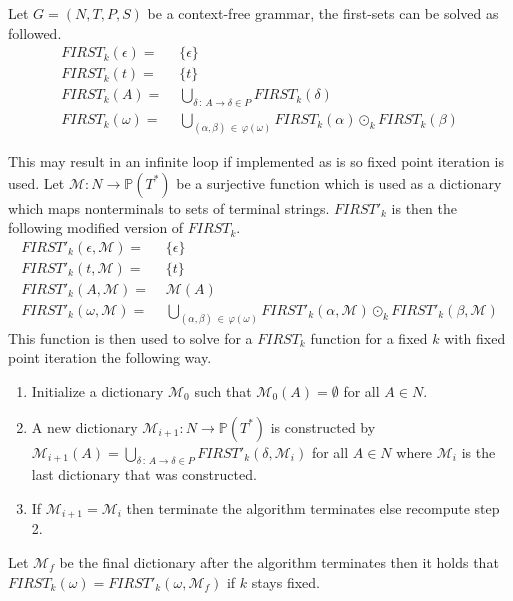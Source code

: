 \begin{algorithm}
    \label{algorithm:first}
    Let $G = (N, T, P, S)$ be a context-free grammar, the first-sets can be solved as followed.
    \begin{align*}
        FIRST_k(\epsilon) =&\,\, \{\epsilon\} \\
        FIRST_k(t) =&\,\, \{t\} \\
        FIRST_k(A) =&\,\, \bigcup_{\delta \, : \, A \to \delta \in P} FIRST_k(\delta) \\
        FIRST_k(\omega) =&\,\, \bigcup_{(\alpha, \beta) \, \in \, \varphi(\omega)} FIRST_k(\alpha) \odot_k FIRST_k(\beta)
    \end{align*}
\end{algorithm}
\noindent This may result in an infinite loop if implemented as is so fixed point iteration is used. Let $\mathcal{M}: N \to \mathbb{P}(T^*)$ be a surjective function which is used as a dictionary which maps nonterminals to sets of terminal strings. $FIRST'_k$ is then the following modified version of $FIRST_k$.
\begin{align*}
    FIRST'_k(\epsilon, \mathcal{M}) =&\,\, \{\epsilon\} \\
    FIRST'_k(t, \mathcal{M}) =&\,\, \{t\} \\
    FIRST'_k(A, \mathcal{M}) =&\,\, \mathcal{M}(A) \\
    FIRST'_k(\omega, \mathcal{M}) =&\,\, \bigcup_{(\alpha, \beta) \, \in \, \varphi(\omega)} FIRST'_k(\alpha, \mathcal{M}) \odot_k FIRST'_k(\beta, \mathcal{M})
\end{align*}
This function is then used to solve for a $FIRST_k$ function for a fixed $k$ with fixed point iteration the following way.
\begin{enumerate}
    \item Initialize a dictionary $\mathcal{M}_0$ such that $\mathcal{M}_0(A) = \emptyset$ for all $A \in N$.
    \item A new dictionary $\mathcal{M}_{i+1}: N \to \mathbb{P}(T^*)$ is constructed by $\mathcal{M}_{i+1}(A) = \bigcup_{\delta \, : \, A \to \delta \in P} FIRST'_k(\delta, \mathcal{M}_{i})$ for all $A \in N$ where $\mathcal{M}_{i}$ is the last dictionary that was constructed.
    \item If $\mathcal{M}_{i + 1} = \mathcal{M}_{i}$ then terminate the algorithm terminates else recompute step 2.
\end{enumerate}
Let $\mathcal{M}_f$ be the final dictionary after the algorithm terminates then it holds that $FIRST_k(\omega) = FIRST'_k(\omega, \mathcal{M}_f)$ if $k$ stays fixed.
